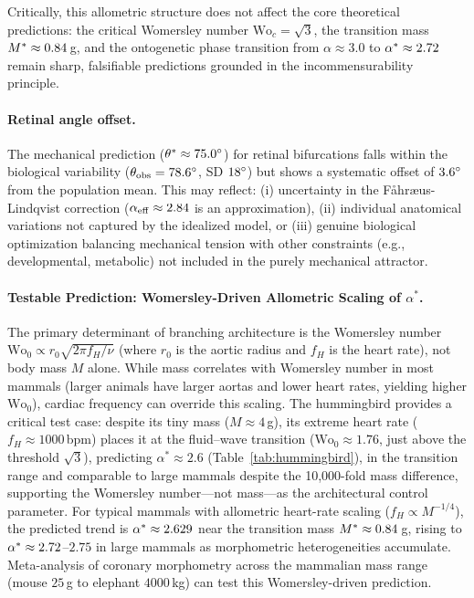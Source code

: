 Critically, this allometric structure does not affect the core theoretical
predictions: the critical Womersley number $\mathrm{Wo}_c = \sqrt{3}$, the
transition mass $M^* \approx 0.84\,$g, and the ontogenetic phase transition
from $\alpha \approx 3.0$ to $\alpha^* \approx 2.72$ remain sharp,
falsifiable predictions grounded in the incommensurability principle.

\paragraph{Retinal angle offset.}
The mechanical prediction ($\theta^* \approx 75.0^\circ$) for
retinal bifurcations falls within the biological variability
($\theta_{\mathrm{obs}} = 78.6^\circ$, SD
$18^\circ$) but shows a systematic offset of
$3.6^\circ$ from the population mean. This may reflect: (i)
uncertainty in the Fåhræus-Lindqvist correction ($\alpha_{\mathrm{eff}} \approx
2.84$ is an approximation), (ii) individual anatomical
variations not captured by the idealized model, or (iii) genuine biological
optimization balancing mechanical tension with other constraints (e.g.,
developmental, metabolic) not included in the purely mechanical attractor.

\paragraph{Testable Prediction: Womersley-Driven Allometric Scaling of $\alpha^*$.}
The primary determinant of branching architecture is the Womersley number
$\mathrm{Wo}_0 \propto r_0 \sqrt{2\pi f_H / \nu}$ (where $r_0$ is the aortic
radius and $f_H$ is the heart rate), not body mass $M$ alone. While mass
correlates with Womersley number in most mammals (larger animals have larger
aortas and lower heart rates, yielding higher $\mathrm{Wo}_0$), cardiac
frequency can override this scaling. The hummingbird provides a critical test
case: despite its tiny mass ($M \approx 4\,$g), its extreme heart rate ($f_H
\approx 1000\,$bpm) places it at the fluid--wave transition ($\mathrm{Wo}_0
\approx 1.76$, just above the threshold $\sqrt{3}$), predicting $\alpha^*
\approx 2.6$ (Table~\ref{tab:hummingbird}), in the transition range and
comparable to large mammals despite the 10,000-fold mass difference,
supporting the Womersley number---not mass---as the architectural
control parameter. For typical mammals with allometric heart-rate scaling ($f_H
\propto M^{-1/4}$), the predicted trend is $\alpha^* \approx
2.629$ near the transition mass $M^* \approx 0.84\,$g, rising
to $\alpha^* \approx 2.72$--$2.75$ in large mammals as morphometric
heterogeneities accumulate. Meta-analysis of coronary morphometry across the
mammalian mass range (mouse $25\,$g to elephant $4000\,$kg) can test this
Womersley-driven prediction.

